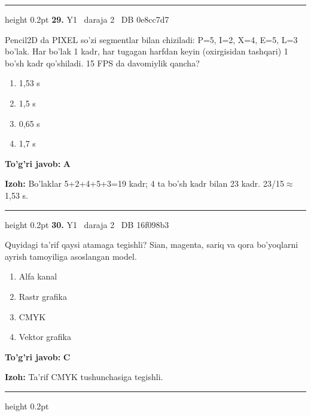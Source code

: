 \documentclass[10pt,a4paper,oneside]{article}
\begin{document}
\vspace{2mm}\hrule height 0.2pt \vspace{4mm}
\hypertarget{q29}{\textbf{\color{ink}29.}}  {\color{muted}\scriptsize Y1 \textbullet\ daraja 2 \textbullet\ DB 0e8cc7d7}
\par
Pencil2D da PIXEL so'zi segmentlar bilan chiziladi: P=5, I=2, X=4, E=5, L=3 bo'lak. Har bo'lak 1 kadr, har tugagan harfdan keyin (oxirgisidan tashqari) 1 bo'sh kadr qo'shiladi. 15 FPS da davomiylik qancha?
\begin{enumerate}[label=\Alph*),leftmargin=9mm]
\item 1,53 s
\item 1,5 s
\item 0,65 s
\item 1,7 s
\end{enumerate}
\begin{tcolorbox}[enhanced,breakable,colback=teal!4,colframe=teal!45!black,boxrule=0.45pt,arc=1.2mm,left=2.8mm,right=2.8mm,top=2mm,bottom=2mm,before skip=2mm,after skip=2mm]
\textbf{\color{teal}To'g'ri javob:} \textbf{A}
\par\smallskip
\textbf{Izoh:} Bo'laklar 5+2+4+5+3=19 kadr; 4 ta bo'sh kadr bilan 23 kadr. 23/15\(\approx\)1,53 s.
\end{tcolorbox}
\vspace{2mm}\hrule height 0.2pt \vspace{4mm}
\hypertarget{q30}{\textbf{\color{ink}30.}}  {\color{muted}\scriptsize Y1 \textbullet\ daraja 2 \textbullet\ DB 16f098b3}
\par
Quyidagi ta'rif qaysi atamaga tegishli? Sian, magenta, sariq va qora bo'yoqlarni ayrish tamoyiliga asoslangan model.
\begin{enumerate}[label=\Alph*),leftmargin=9mm]
\item Alfa kanal
\item Rastr grafika
\item CMYK
\item Vektor grafika
\end{enumerate}
\begin{tcolorbox}[enhanced,breakable,colback=teal!4,colframe=teal!45!black,boxrule=0.45pt,arc=1.2mm,left=2.8mm,right=2.8mm,top=2mm,bottom=2mm,before skip=2mm,after skip=2mm]
\textbf{\color{teal}To'g'ri javob:} \textbf{C}
\par\smallskip
\textbf{Izoh:} Ta'rif CMYK tushunchasiga tegishli.
\end{tcolorbox}
\vspace{2mm}\hrule height 0.2pt \vspace{4mm}
\end{document}
